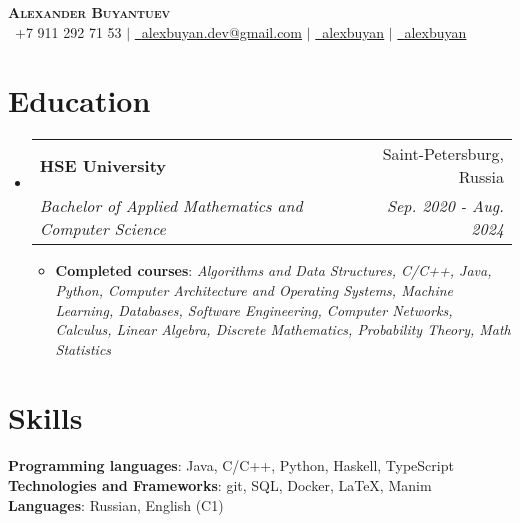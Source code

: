 \documentclass[english,russian,letterpaper,11pt]{article}
\makeatletter
\newcommand{\resumeItem}[1]{
  \item\small{
    {#1 \vspace{-2pt}}
  }
}
\newcommand{\resumeSubheading}[4]{
  \vspace{-2pt}\item
    \begin{tabular*}{0.97\textwidth}[t]{l@{\extracolsep{\fill}}r}
      \textbf{#1} & #2 \\
      \textit{\small#3} & \textit{\small #4} \\
    \end{tabular*}\vspace{-7pt}
}
\newcommand{\resumeSubHeadingListStart}{\begin{itemize}[leftmargin=0.15in, label={}]}
\newcommand{\resumeSubHeadingListEnd}{\end{itemize}}
\newcommand{\resumeItemListStart}{\begin{itemize}}
\newcommand{\resumeItemListEnd}{\end{itemize}\vspace{-5pt}}
\makeatother
\begin{document}

\begin{center}
    \textbf{\Huge \scshape Alexander Buyantuev} \\ \vspace{2pt}
    \small \faPhone \ +7 911 292 71 53 $|$ \href{mailto:alexbuyan.dev@gmail.com}{\faEnvelope \ \underline{alexbuyan.dev@gmail.com}} $|$ 
    \href{https://github.com/alexbuyan}{\faGithub \ \underline{alexbuyan}} $|$ \href{https://www.linkedin.com/in/alexander-buyantuev-063785223}{\faLinkedin \ \underline{alexbuyan}}
\end{center}


\section{Education}
  \resumeSubHeadingListStart
    \resumeSubheading
      {HSE University}{Saint-Petersburg, Russia}
      {Bachelor of Applied Mathematics and Computer Science}{Sep. 2020 - Aug. 2024}
      \resumeItemListStart
        \resumeItem{\textbf{Completed courses}: \textit{Algorithms and Data Structures, C/C++, Java, Python, Computer Architecture and Operating Systems, Machine Learning, Databases, Software Engineering, Computer Networks, Calculus, Linear Algebra, Discrete Mathematics, Probability Theory, Math Statistics}}
      \resumeItemListEnd
  \resumeSubHeadingListEnd

\section{Skills}
 \begin{itemize}[leftmargin=0.15in, label={}]
    \small{\item{
     \textbf{Programming languages}{: Java, C/C++, Python, Haskell, TypeScript} \\
     \textbf{Technologies and Frameworks}{: git, SQL, Docker, \LaTeX, Manim} \\
     \textbf{Languages}{: Russian, English (C1)} \\
    }}
 \end{itemize}
\end{document}
